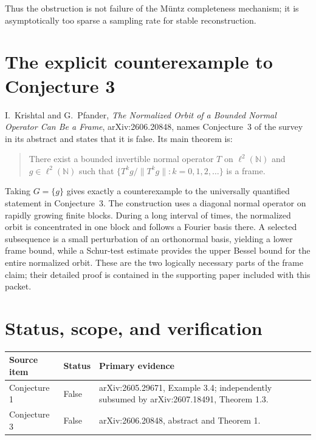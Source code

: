 \documentclass[11pt]{article}
\newcommand{\N}{\mathbb N}
\begin{document}
Thus the obstruction is not failure of the M\"untz completeness mechanism;
it is asymptotically too sparse a sampling rate for stable reconstruction.

\section{The explicit counterexample to Conjecture 3}

I.~Krishtal and G.~Pfander, \emph{The Normalized Orbit of a Bounded Normal
Operator Can Be a Frame}, arXiv:2606.20848, names Conjecture~3 of the survey
in its abstract and states that it is false.  Its main theorem is:

\begin{quote}
There exist a bounded invertible normal operator \(T\) on \(\ell^2(\N)\)
and \(g\in\ell^2(\N)\) such that
\(\{T^kg/\lVert T^kg\rVert:k=0,1,2,\ldots\}\) is a frame.
\end{quote}

Taking \(G=\{g\}\) gives exactly a counterexample to the universally
quantified statement in Conjecture~3.  The construction uses a diagonal
normal operator on rapidly growing finite blocks.  During a long interval of
times, the normalized orbit is concentrated in one block and follows a
Fourier basis there.  A selected subsequence is a small perturbation of an
orthonormal basis, yielding a lower frame bound, while a Schur-test estimate
provides the upper Bessel bound for the entire normalized orbit.  These are
the two logically necessary parts of the frame claim; their detailed proof is
contained in the supporting paper included with this packet.

\section{Status, scope, and verification}

\begin{center}
\begin{tabular}{p{}p{}p{}}
\hline
Source item & Status & Primary evidence \\
\hline
Conjecture 1 & False & arXiv:2605.29671, Example 3.4; independently subsumed by
arXiv:2607.18491, Theorem 1.3. \\
Conjecture 3 & False & arXiv:2606.20848, abstract and Theorem 1. \\
\hline
\end{tabular}
\end{center}
\end{document}
